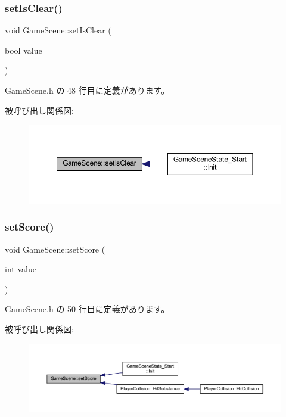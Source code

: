 \subsubsection{\texorpdfstring{set\+Is\+Clear()}{setIsClear()}}
{\footnotesize\ttfamily void Game\+Scene\+::set\+Is\+Clear (\begin{DoxyParamCaption}\item[{bool}]{value }\end{DoxyParamCaption})\hspace{0.3cm}{\ttfamily [inline]}}



 Game\+Scene.\+h の 48 行目に定義があります。

被呼び出し関係図\+:
\nopagebreak
\begin{figure}[H]
\begin{center}
\leavevmode
\includegraphics[width=350pt]{class_game_scene_a1bd84ecb8d44bd5e57b4a2d772ef1bf9_icgraph}
\end{center}
\end{figure}
\mbox{\label{class_game_scene_a853fefbf82ff85b9f34e325108ae7e3b}} 
\subsubsection{\texorpdfstring{set\+Score()}{setScore()}}
{\footnotesize\ttfamily void Game\+Scene\+::set\+Score (\begin{DoxyParamCaption}\item[{int}]{value }\end{DoxyParamCaption})\hspace{0.3cm}{\ttfamily [inline]}}



 Game\+Scene.\+h の 50 行目に定義があります。

被呼び出し関係図\+:
\nopagebreak
\begin{figure}[H]
\begin{center}
\leavevmode
\includegraphics[width=350pt]{class_game_scene_a853fefbf82ff85b9f34e325108ae7e3b_icgraph}
\end{center}
\end{figure}


